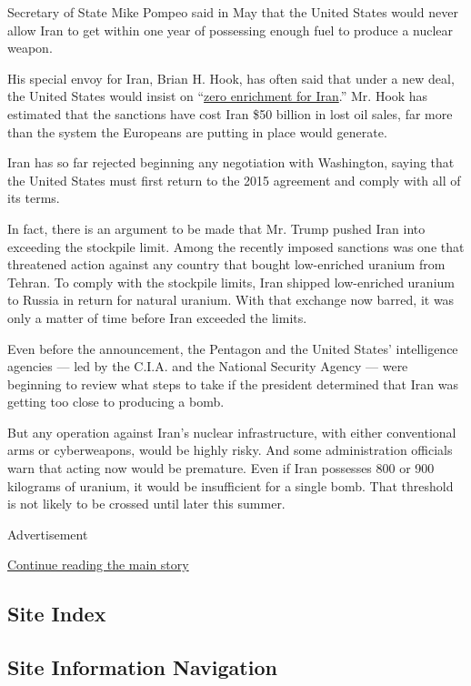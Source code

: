 Secretary of State Mike Pompeo said in May that the United States would
never allow Iran to get within one year of possessing enough fuel to
produce a nuclear weapon.

His special envoy for Iran, Brian H. Hook, has often said that under a
new deal, the United States would insist on
``\href{https://www.nytimes3xbfgragh.onion/2019/05/17/us/politics/trump-iran-nuclear-deal.html?module=inline}{zero
enrichment for Iran}.'' Mr. Hook has estimated that the sanctions have
cost Iran \$50 billion in lost oil sales, far more than the system the
Europeans are putting in place would generate.

Iran has so far rejected beginning any negotiation with Washington,
saying that the United States must first return to the 2015 agreement
and comply with all of its terms.

In fact, there is an argument to be made that Mr. Trump pushed Iran into
exceeding the stockpile limit. Among the recently imposed sanctions was
one that threatened action against any country that bought low-enriched
uranium from Tehran. To comply with the stockpile limits, Iran shipped
low-enriched uranium to Russia in return for natural uranium. With that
exchange now barred, it was only a matter of time before Iran exceeded
the limits.

Even before the announcement, the Pentagon and the United States'
intelligence agencies --- led by the C.I.A. and the National Security
Agency --- were beginning to review what steps to take if the president
determined that Iran was getting too close to producing a bomb.

But any operation against Iran's nuclear infrastructure, with either
conventional arms or cyberweapons, would be highly risky. And some
administration officials warn that acting now would be premature. Even
if Iran possesses 800 or 900 kilograms of uranium, it would be
insufficient for a single bomb. That threshold is not likely to be
crossed until later this summer.

Advertisement

\protect\hyperlink{after-bottom}{Continue reading the main story}

\hypertarget{site-index}{%
\subsection{Site Index}\label{site-index}}

\hypertarget{site-information-navigation}{%
\subsection{Site Information
Navigation}\label{site-information-navigation}}

